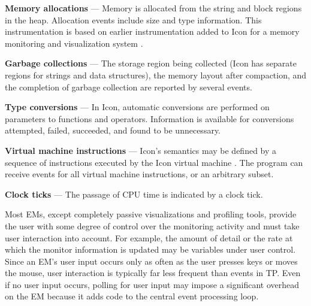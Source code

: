 \begin{list}{}{\itemsep 7pt} %
\item [{\bf Memory allocations}] --- Memory is allocated from the
	string and block regions in the heap.  Allocation events
	include size and type information.
	This instrumentation is based on earlier instrumentation added to Icon
	for a memory monitoring and visualization system \cite{Townsend89}.

\item [{\bf Garbage collections}] --- The storage region being
	collected (Icon has separate regions for strings and data
	structures), the memory layout after compaction, and the
	completion of garbage collection are reported by several events.
\item [{\bf Type conversions}] --- In Icon, automatic conversions are
	performed on parameters	to functions and
	operators.  Information is available for conversions
	attempted, failed, succeeded, and found to be unnecessary.
\item [{\bf Virtual machine instructions}] --- Icon's semantics may be
	defined by a sequence of instructions executed by the Icon virtual
	machine \cite{Griswold86}.  The program can receive events for
	all virtual machine instructions, or an arbitrary subset.
\item [{\bf Clock ticks}] --- The  passage of CPU time
	is indicated by a clock tick.
\end{list}


Most EMs, except completely passive visualizations and profiling
tools, provide the user with some degree of control over the
monitoring activity and must take user interaction into account.
For example, the amount of detail or the rate at which the monitor
information is updated may be variables under user control.  Since
an EM's user input occurs only as often as the user presses keys or
moves the mouse, user interaction is typically far less frequent than
events in TP.  Even if no user input occurs, polling for user input
may impose a significant overhead on the EM because it adds code to
the central event processing loop.

